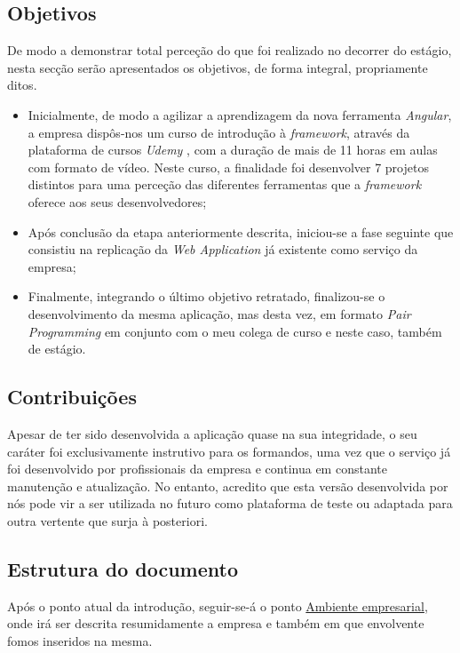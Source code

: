 \documentclass{article}
\begin{document}
\subsection{Objetivos}
\hspace{0.5cm} De modo a demonstrar total perceção do que foi realizado no decorrer do estágio, nesta secção serão apresentados os objetivos, de forma integral, propriamente ditos.
\begin{itemize}
  \item Inicialmente, de modo a agilizar a aprendizagem da nova ferramenta \emph{Angular}, a empresa dispôs-nos um curso de introdução à \emph{framework}, através da plataforma de cursos \emph{Udemy} \cite{udemy}, com a duração de mais de 11 horas em aulas com formato de vídeo. Neste curso, a finalidade foi desenvolver 7 projetos distintos para uma perceção das diferentes ferramentas que a \emph{framework} oferece aos seus desenvolvedores;
  \item Após conclusão da etapa anteriormente descrita, iniciou-se a fase seguinte que consistiu na replicação da \emph{Web Application} \cite{webapp} já existente como serviço da empresa;
  \item Finalmente, integrando o último objetivo retratado, finalizou-se o desenvolvimento da mesma aplicação, mas desta vez, em formato \emph{Pair Programming} \cite{pp} em conjunto com o meu colega de curso e neste caso, também de estágio.
\end{itemize}

\vspace*{0.125cm}

\subsection{Contribuições}
\hspace*{0.5cm} Apesar de ter sido desenvolvida a aplicação quase na sua integridade, o seu caráter foi exclusivamente instrutivo para os formandos, uma vez que o serviço já foi desenvolvido por profissionais da empresa e continua em constante manutenção e atualização. No entanto, acredito que esta versão desenvolvida por nós pode vir a ser utilizada no futuro como plataforma de teste ou adaptada para outra vertente que surja à posteriori. \newline

\subsection{Estrutura do documento}
\hspace*{0.5cm} Após o ponto atual da introdução, seguir-se-á o ponto \hyperref[sec:amb-emp]{Ambiente empresarial}, onde irá ser descrita resumidamente a empresa e também em que envolvente fomos inseridos na mesma.
\end{document}
